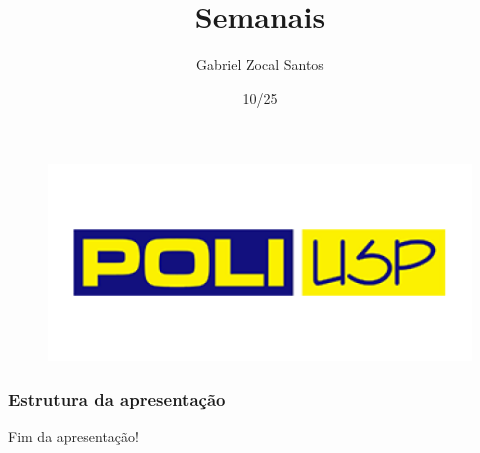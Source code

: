 \documentclass[
    11pt,               %
]{beamer}
\title[Semanais]{Semanais}          %
\author[Gabriel Zocal]{Gabriel Zocal Santos}            %
\institute[Poli-USP]{Escola Politecnica \\ (Poli-USP)}
\date[2025]{10/25}
\begin{document}
\begin{frame}
    \begin{figure}
        \includegraphics[width=0.4\linewidth]{img/logo_POLI2.png}
    \end{figure}
    \titlepage
\end{frame}

\begin{frame}
    \frametitle{Estrutura da apresentação}
    \tableofcontents
    
\end{frame}


%
% 
% 
%

\begin{frame}
    \begin{center}
        {\Huge Fim da apresentação!}
    \end{center}
\end{frame}
\end{document}
